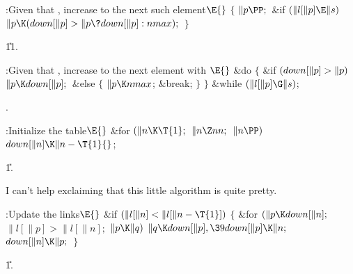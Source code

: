 \Y\B\4:Given that , increase  to the next such
element\X${}\E{}$\6
${}\{{}$\1\6
${}\|p\PP;{}$\6
\&{if} ${}(\|l[\|p]\E\|s){}$\1\5
${}\|p\K(\\{down}[\|p]>\|p\?\\{down}[\|p]:\\{nmax});{}$\2\6
\4${}\}{}$\2\par
\U11.\fi

\B{}:Given that , increase  to the next
element with \X${}\E{}$\6
\&{do}\5
${}\{{}$\1\6
\&{if} ${}(\\{down}[\|p]>\|p){}$\1\5
${}\|p\K\\{down}[\|p];{}$\2\6
\&{else}\5
${}\{{}$\1\6
${}\|p\K\\{nmax}{}$;\5
\&{break};\6
\4${}\}{}$\2\6
\4${}\}{}$\5
\2\5
\&{while} ${}(\|l[\|p]\G\|s){}$;\par
{}.\fi

\B{}:Initialize the  table\X${}\E{}$\6
\&{for} ${}(\|n\K\T{1};{}$ ${}\|n\Z\\{nn};{}$ ${}\|n\PP){}$\1\5
${}\\{down}[\|n]\K\|n-\T{1}{}$;\2\par
\U1.\fi

I can't help exclaiming that this little algorithm is quite pretty.

\Y\B\4:Update the  links\X${}\E{}$\6
\&{if} ${}(\|l[\|n]<\|l[\|n-\T{1}]){}$\5
${}\{{}$\1\6
\&{for} ${}(\|p\K\\{down}[\|n];{}$ ${}\|l[\|p]>\|l[\|n];{}$ ${}\|p\K\|q){}$\1\5
${}\|q\K\\{down}[\|p],\39\\{down}[\|p]\K\|n;{}$\2\6
${}\\{down}[\|n]\K\|p;{}$\6
\4${}\}{}$\2\par
\U1.\fi


